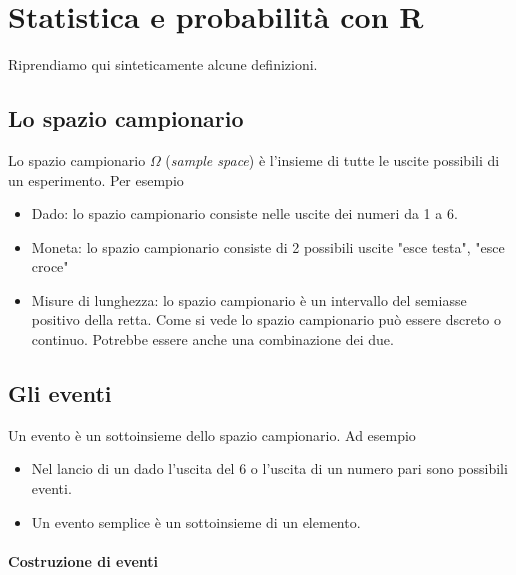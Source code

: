 \documentclass[onecolumn,12pt]{book}\usepackage[]{graphicx}\usepackage[]{color}
\author{Federico Comoglio e  Maurizio Rinaldi}
\begin{document}



\markright{\today}
\thispagestyle{empty}
\maketitle
\newpage
\thispagestyle{empty}
\tableofcontents
\newpage
\thispagestyle{empty}
 \mainmatter

 

 
 
\chapter{Statistica e probabilit\`a  con \textsf{R}}
Riprendiamo qui sinteticamente alcune definizioni.
\section{Lo spazio campionario}

Lo spazio campionario $\Omega$  (\emph{sample space}) è l'insieme di tutte le uscite possibili di un esperimento. Per esempio 
\begin{itemize}
\item Dado: lo spazio campionario consiste nelle uscite dei numeri da 1 a 6. \item Moneta: lo spazio campionario consiste di 2 possibili  uscite "esce testa", "esce croce"
\item Misure di lunghezza: lo spazio campionario è un intervallo del semiasse positivo della retta. 
Come si vede lo spazio campionario pu\`o essere dscreto o continuo. Potrebbe essere anche una combinazione dei due.
\end{itemize}
\section{Gli eventi}


 Un evento è un sottoinsieme dello spazio campionario. 
 Ad esempio
\begin{itemize}
\item Nel lancio di un dado l'uscita del 6 o l'uscita di un numero pari sono possibili eventi. 
\item Un evento semplice è un sottoinsieme di un elemento.
\end{itemize}


\subsubsection{Costruzione di eventi}
\end{document}
